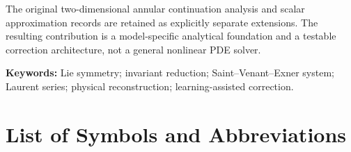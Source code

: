 \documentclass[12pt,a4paper,oneside]{report}
\numberwithin{equation}{chapter}
\theoremstyle{remark}\newtheorem{remark}[theorem]{Remark}
\begin{document}
The original two-dimensional annular continuation analysis and scalar approximation records are retained as explicitly separate extensions. The resulting contribution is a model-specific analytical foundation and a testable correction architecture, not a general nonlinear PDE solver.

\medskip\noindent\textbf{Keywords:} Lie symmetry; invariant reduction; Saint--Venant--Exner system; Laurent series; physical reconstruction; learning-assisted correction.
\clearpage
\tableofcontents
\clearpage
{}
\listoffigures
\clearpage
{}
\listoftables
\clearpage
\chapter*{List of Symbols and Abbreviations}\label{sec:notation}
\end{document}

